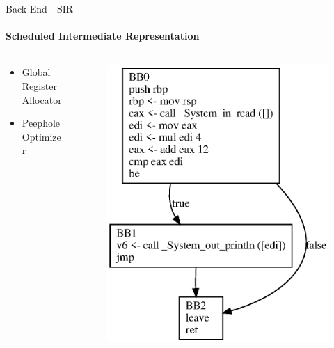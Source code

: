 \documentclass[en,16:9]{sdqbeamer}
\begin{document}
\begin{frame}{Back End - SIR}
	\framesubtitle{Scheduled Intermediate Representation}
	
	\begin{columns}
		\begin{column}{0.5\textwidth}
			\begin{itemize}
				\item Global Register Allocator
				\item Peephole Optimizer
			\end{itemize}
		\end{column}

		\begin{column}{0.5\textwidth}
			\begin{figure}
				\centering
				\includegraphics[scale=0.5]{images/sir-after-reg-alloc}
			\end{figure}
		\end{column}
	\end{columns}
\end{frame}



\end{document}
